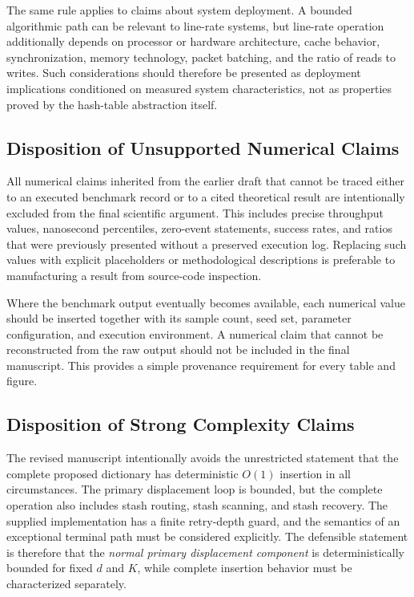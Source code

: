 \documentclass[conference]{IEEEtran}
\begin{document}
The same rule applies to claims about system deployment. A bounded algorithmic path can be relevant to line-rate systems, but line-rate operation additionally depends on processor or hardware architecture, cache behavior, synchronization, memory technology, packet batching, and the ratio of reads to writes. Such considerations should therefore be presented as deployment implications conditioned on measured system characteristics, not as properties proved by the hash-table abstraction itself.

\subsection{Disposition of Unsupported Numerical Claims}

All numerical claims inherited from the earlier draft that cannot be traced either to an executed benchmark record or to a cited theoretical result are intentionally excluded from the final scientific argument. This includes precise throughput values, nanosecond percentiles, zero-event statements, success rates, and ratios that were previously presented without a preserved execution log. Replacing such values with explicit placeholders or methodological descriptions is preferable to manufacturing a result from source-code inspection.

Where the benchmark output eventually becomes available, each numerical value should be inserted together with its sample count, seed set, parameter configuration, and execution environment. A numerical claim that cannot be reconstructed from the raw output should not be included in the final manuscript. This provides a simple provenance requirement for every table and figure.

\subsection{Disposition of Strong Complexity Claims}

The revised manuscript intentionally avoids the unrestricted statement that the complete proposed dictionary has deterministic $O(1)$ insertion in all circumstances. The primary displacement loop is bounded, but the complete operation also includes stash routing, stash scanning, and stash recovery. The supplied implementation has a finite retry-depth guard, and the semantics of an exceptional terminal path must be considered explicitly. The defensible statement is therefore that the \emph{normal primary displacement component} is deterministically bounded for fixed $d$ and $K$, while complete insertion behavior must be characterized separately.
\end{document}
